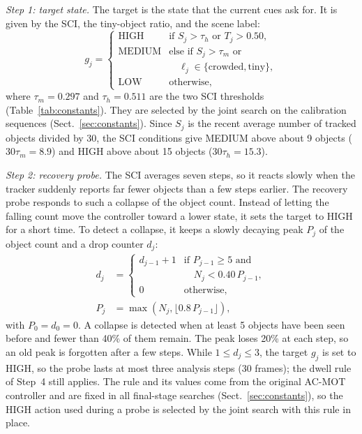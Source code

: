 \documentclass[pdflatex,sn-mathphys-num,iicol]{sn-jnl}
\begin{document}
\emph{Step 1: target state.} The target is the state that the current cues
ask for. It is given by the SCI, the tiny-object ratio, and the scene label:
\begin{equation}
g_j=\begin{cases}
\text{HIGH}   & \text{if } S_j>\tau_h \text{ or } T_j>0.50,\\
\text{MEDIUM} & \text{else if } S_j>\tau_m \text{ or}\\
              & \quad \ell_j\in\{\text{crowded},\text{tiny}\},\\
\text{LOW}    & \text{otherwise,}
\end{cases}
\label{eq:target}
\end{equation}
where $\tau_m=0.297$ and $\tau_h=0.511$ are the two SCI thresholds
(Table~\ref{tab:constants}). They are selected by the joint search
on the calibration sequences (Sect.~\ref{sec:constants}). Since $S_j$ is the
recent average number of tracked objects divided by 30, the SCI conditions
give MEDIUM above about 9 objects ($30\tau_m=8.9$) and HIGH above about 15
objects ($30\tau_h=15.3$).

\emph{Step 2: recovery probe.} The SCI averages seven steps, so it reacts
slowly when the tracker suddenly reports far fewer objects than a few steps
earlier. The recovery probe responds to such a collapse of the object count.
Instead of letting the falling count move the controller toward a lower
state, it sets the target to HIGH for a short time. To detect a collapse, it
keeps a slowly decaying peak $P_j$ of the object count and a drop counter
$d_j$:
\begin{align}
d_j&=\begin{cases}
d_{j-1}+1 & \text{if } P_{j-1}\ge5 \text{ and}\\
          & \quad N_j<0.40\,P_{j-1},\\
0         & \text{otherwise,}
\end{cases}\label{eq:drop}\\
P_j&=\max\left(N_j,\lfloor 0.8\,P_{j-1}\rfloor\right),\label{eq:peak}
\end{align}
with $P_0=d_0=0$. A collapse is detected when at least 5 objects have been seen
before and fewer than 40\% of them remain. The peak loses 20\% at each step,
so an old peak is forgotten after a few steps. While $1\le d_j\le3$, the
target $g_j$ is set to HIGH, so the probe lasts at most three analysis steps
(30 frames); the dwell rule of Step~4 still applies. The rule and its values
come from the original AC-MOT controller and are fixed in all final-stage
searches (Sect.~\ref{sec:constants}), so the HIGH action used during a probe
is selected by the joint search with this rule in place.
\end{document}
